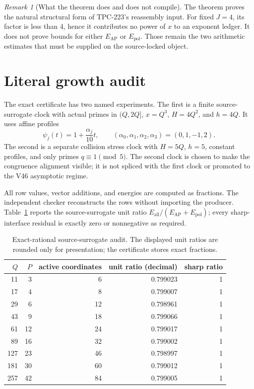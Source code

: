 \documentclass[11pt]{article}
\theoremstyle{remark}
\newtheorem{remark}[theorem]{Remark}
\newcommand{\Eall}{E_{\mathrm{all}}}
\newcommand{\Eap}{E_{\mathrm{AP}}}
\newcommand{\Epol}{E_{\mathrm{pol}}}
\begin{document}
\begin{remark}[What the theorem does and does not compile]
The theorem proves the natural structural form of TPC-223's reassembly input.
For fixed $J=4$, its factor is less than $4$, hence it contributes no power
of $x$ to an exponent ledger.  It does not prove bounds for either $\Eap$ or
$\Epol$.  Those remain the two arithmetic estimates that must be supplied on
the source-locked object.
\end{remark}

\section{Literal growth audit}

The exact certificate has two named experiments.  The first is a finite
source-surrogate clock with actual primes in $(Q,2Q]$, $x=Q^3$,
$H=4Q^2$, and $h=4Q$.  It uses affine profiles
\[
 \psi_j(t)=1+\frac{\alpha_j}{10}t,
 \qquad (\alpha_0,\alpha_1,\alpha_2,\alpha_3)=(0,1,-1,2).
\]
The second is a separate collision stress clock with $H=5Q$, $h=5$, constant
profiles, and only primes $q\equiv1\pmod5$.  The second clock is chosen to
make the congruence alignment visible; it is not spliced with the first clock
or promoted to the V46 asymptotic regime.

All row values, vector additions, and energies are computed as fractions.  The
independent checker reconstructs the rows without importing the producer.
Table~\ref{tab:source} reports the source-surrogate unit ratio
$\Eall/(\Eap+\Epol)$; every sharp-interface residual is exactly zero or
nonnegative as required.

\begin{table}[t]
\centering
\small
\begin{tabular}{rrrrr}
\toprule
$Q$ & $P$ & active coordinates & unit ratio (decimal) & sharp ratio\\
\midrule
11  & 3  & 6  & 0.799023 & 1\\
17  & 4  & 8  & 0.799007 & 1\\
29  & 6  & 12 & 0.798961 & 1\\
43  & 9  & 18 & 0.799066 & 1\\
61  & 12 & 24 & 0.799017 & 1\\
89  & 16 & 32 & 0.799002 & 1\\
127 & 23 & 46 & 0.798997 & 1\\
181 & 30 & 60 & 0.799012 & 1\\
257 & 42 & 84 & 0.799005 & 1\\
\bottomrule
\end{tabular}
\caption{Exact-rational source-surrogate audit.  The displayed unit ratios
are rounded only for presentation; the certificate stores exact fractions.}
\label{tab:source}
\end{table}
\end{document}
